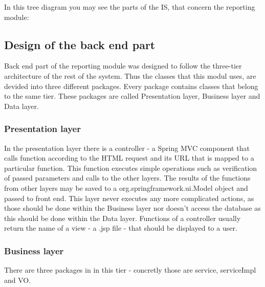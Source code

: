 \documentclass[thesis=B,english]{FITthesis}[2012/10/20]
\begin{document}
In this tree diagram you may see the parts of the IS, that concern the reporting module:



\subsection{Design of the back end part}
Back end part of the reporting module was designed to follow the three-tier architecture of the rest of the system. Thus the classes that this modul uses, are devided into three different packages. Every package contains classes that belong to the same tier. These packages are called Presentation layer, Business layer and Data layer. 

\subsubsection{Presentation layer}
In the presentation layer there is a controller - a Spring MVC component that calls function according to the HTML request and its URL that is mapped to a particular function. This function executes simple operations such as verification of passed parameters and calls to the other layers. The results of the functions from other layers may be saved to a org.springframework.ui.Model object and passed to front end. This layer never executes any more complicated actions, as those should be done within the Business layer nor doesn't access the database as this should be done within the Data layer. Functions of a controller usually return the name of a view - a .jsp file - that should be displayed to a user.
\subsubsection{Business layer}
There are three packages in in this tier - concretly those are service, serviceImpl and VO. 
\end{document}
